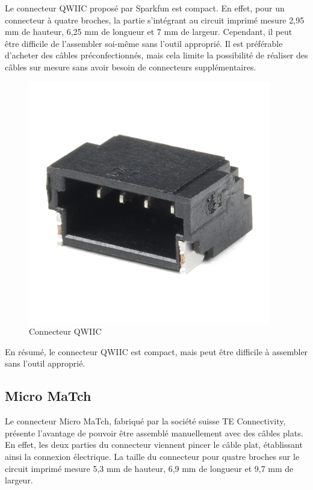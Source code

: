 Le connecteur QWIIC proposé par Sparkfun est compact.
En effet, pour un connecteur à quatre broches, la partie s'intégrant au circuit imprimé mesure 2,95 mm de hauteur, 6,25 mm de longueur et 7 mm de largeur.
Cependant, il peut être difficile de l'assembler soi-même sans l'outil approprié.
Il est préférable d'acheter des câbles préconfectionnés, mais cela limite la possibilité de réaliser des câbles sur mesure sans avoir besoin de connecteurs supplémentaires.

\begin{figure}[H]
    \centering
    \includegraphics[scale=0.6]{./assets/figures/qwiic.jpg}
    \caption{\cite{qwiic} Connecteur QWIIC}
\end{figure}

En résumé, le connecteur QWIIC est compact, mais peut être difficile à assembler sans l'outil approprié.

\subsection{Micro MaTch}

Le connecteur Micro MaTch, fabriqué par la société suisse TE Connectivity, présente l'avantage de pouvoir être assemblé manuellement avec des câbles plats.
En effet, les deux parties du connecteur viennent pincer le câble plat, établissant ainsi la connexion électrique.
La taille du connecteur pour quatre broches sur le circuit imprimé mesure 5,3 mm de hauteur, 6,9 mm de longueur et 9,7 mm de largeur.

